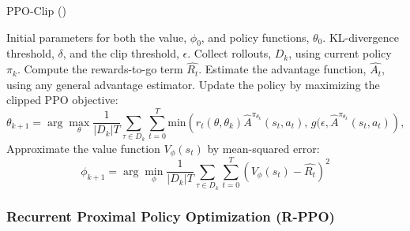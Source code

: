             \begin{algorithm}[htbp]
            \caption{PPO-Clip (\cite{schulman2017proximal})} 
            \label{alg:PPO-Clip}
            
            \begin{algorithmic}[1]
            \State {} Initial parameters for both the value, $\phi_0$, and policy functions, $\theta_0$.
            \State {} KL-divergence threshold, $\delta$, and the clip threshold, $\epsilon$.
            \For{}
                \State Collect rollouts, $D_k$, using current policy $\pi_k$.
                \State Compute the rewards-to-go term $\hat{R_t}$. 
                \State Estimate the advantage function, $\hat{A_t}$, using any general advantage estimator.
                \State Update the policy by maximizing the clipped PPO objective: 
                \begin{equation*}
                \theta_{k+1} = \arg \max_{\theta} \frac{1}{|D_k| T} \sum_{\tau \in D_k} \sum_{t=0}^{T} \text{min}\left (r_t(\theta, \theta_k) \hat{A}^{\pi_{\theta_k}}(s_t, a_t)\text{, }g(\epsilon, \hat{A}^{\pi_{\theta_k}}(s_t, a_t)\right),
                \end{equation*}
                \State Approximate the value function $V_{\phi}(s_t)$ by mean-squared error:
                \begin{equation*}
                \phi_{k+1} = \arg \min_{\phi} \frac{1}{|D_k| T} \sum_{\tau \in D_k} \sum_{t=0}^{T} \left( V_\phi(s_t) - \hat{R_t} \right)^2
                \end{equation*}
            \EndFor
            \end{algorithmic}
            \end{algorithm}

        \subsubsection{Recurrent Proximal Policy Optimization (R-PPO)}
        \label{sec:rppo}

